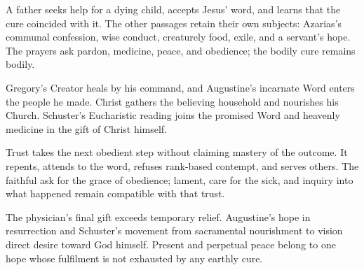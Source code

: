 \begin{fourSenses}
\item[Literal.]
A father seeks help for a dying child, accepts Jesus' word, and learns
that the cure coincided with it. The other passages retain their own
subjects: Azarias's communal confession, wise conduct, creaturely food,
exile, and a servant's hope. The prayers ask pardon, medicine, peace,
and obedience; the bodily cure remains bodily.
\item[Allegorical.]
Gregory's Creator heals by his command, and Augustine's incarnate Word
enters the people he made. Christ gathers the believing household and
nourishes his Church. Schuster's Eucharistic reading joins the promised
Word and heavenly medicine in the gift of Christ himself.
\item[Moral.]
Trust takes the next obedient step without claiming mastery of the
outcome. It repents, attends to the word, refuses rank-based contempt,
and serves others. The faithful ask for the grace of obedience; lament,
care for the sick, and inquiry into what happened remain compatible
with that trust.
\item[Anagogical.]
The physician's final gift exceeds temporary relief. Augustine's hope
in resurrection and Schuster's movement from sacramental nourishment
to vision direct desire toward God himself. Present and perpetual peace
belong to one hope whose fulfilment is not exhausted by any earthly cure.
\end{fourSenses}
